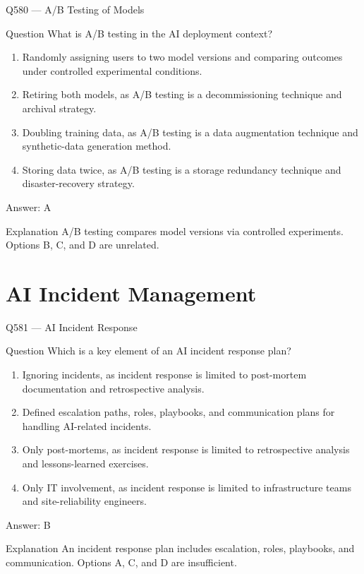 \documentclass[aspectratio=169,8pt]{beamer}
\begin{document}
	\begin{frame}{Q580 --- A/B Testing of Models}
		\begin{block}{Question}
			What is A/B testing in the AI deployment context?
			\begin{enumerate}
				\item Randomly assigning users to two model versions and comparing outcomes under controlled experimental conditions.
				\item Retiring both models, as A/B testing is a decommissioning technique and archival strategy.
				\item Doubling training data, as A/B testing is a data augmentation technique and synthetic-data generation method.
				\item Storing data twice, as A/B testing is a storage redundancy technique and disaster-recovery strategy.
			\end{enumerate}
		\end{block}
		\begin{exampleblock}{Answer: A}\end{exampleblock}
		\begin{block}{Explanation}
			A/B testing compares model versions via controlled experiments. Options B, C, and D are unrelated.
		\end{block}
	\end{frame}
	
	\section{AI Incident Management}
	
	\begin{frame}{Q581 --- AI Incident Response}
		\begin{block}{Question}
			Which is a key element of an AI incident response plan?
			\begin{enumerate}
				\item Ignoring incidents, as incident response is limited to post-mortem documentation and retrospective analysis.
				\item Defined escalation paths, roles, playbooks, and communication plans for handling AI-related incidents.
				\item Only post-mortems, as incident response is limited to retrospective analysis and lessons-learned exercises.
				\item Only IT involvement, as incident response is limited to infrastructure teams and site-reliability engineers.
			\end{enumerate}
		\end{block}
		\begin{exampleblock}{Answer: B}\end{exampleblock}
		\begin{block}{Explanation}
			An incident response plan includes escalation, roles, playbooks, and communication. Options A, C, and D are insufficient.
		\end{block}
	\end{frame}
	
\end{document}
